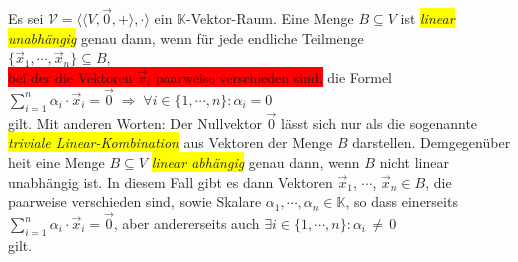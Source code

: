 \begin{Definition} \lb
Es sei $\mathcal{V} = \bigl\langle \langle V, \vec{0}, + \rangle, \cdot \bigr\rangle$ ein $\mathbb{K}$-Vektor-Raum.  
Eine Menge $B \subseteq V$ ist \colorbox{yellow}{\emph{linear unabh\"{a}ngig}} genau dann, wenn 
f\"{u}r jede endliche Teilmenge
\\[0.2cm]
\hspace*{1.3cm}
$\bigl\{ \vec{x}_1, \cdots, \vec{x}_n \bigr\} \subseteq B$,
\\[0.2cm]
\colorbox{red}{bei der die Vektoren $\vec{x}_i$ paarweise verschieden sind,} die Formel
\\[0.2cm]
\hspace*{1.3cm}
$\sum\limits_{i=1}^n \alpha_i \cdot \vec{x}_i = \vec{0} \;\Rightarrow\; \forall i \in \{1,\cdots,n\}: \alpha_i = 0$
\\[0.2cm]
gilt.  Mit anderen Worten:  Der Nullvektor $\vec{0}$ l\"{a}sst sich nur als die sogenannte
\colorbox{yellow}{\emph{triviale Linear-Kombination}} aus Vektoren der Menge $B$ darstellen.  Demgegen\"{u}ber hei\3t eine
Menge $B \subseteq V$ \colorbox{yellow}{\emph{linear abh\"{a}ngig}} genau dann, wenn $B$ nicht linear unabh\"{a}ngig ist.  In
diesem Fall gibt es dann Vektoren $\vec{x}_1$, $\cdots$, $\vec{x}_n \in B$, die paarweise
verschieden sind, sowie Skalare $\alpha_1,\cdots,\alpha_n \in \mathbb{K}$, so dass einerseits
\\[0.2cm]
\hspace*{1.3cm}
$\sum\limits_{i=1}^n \alpha_i \cdot \vec{x}_i = \vec{0}$, \quad aber andererseits auch \quad
$\exists i \in \{1,\cdots,n\}: \alpha_i \,\not=\, 0$
\\[0.2cm]
gilt.  
\eoxs
\end{Definition}

